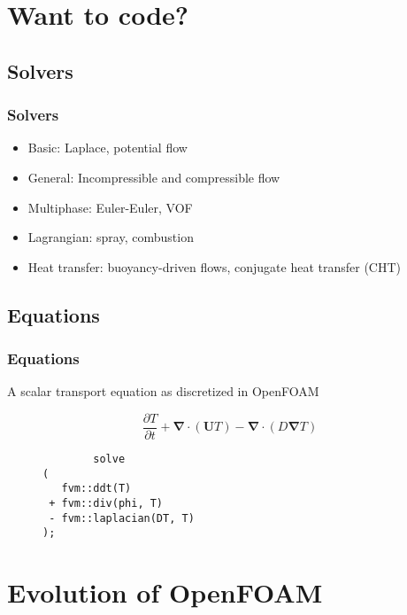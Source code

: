 \documentclass[notheorems, aspectratio=169]{beamer}
\begin{document}
\section{Want to code?}
\frame{\tableofcontents[currentsection]}
\subsection{Solvers}

\begin{frame}
  \frametitle{Solvers}
  \begin{itemize}
   \item Basic: Laplace, potential flow
   \item General: Incompressible and compressible flow
   \item Multiphase: Euler-Euler, VOF 
   \item Lagrangian: spray, combustion
   \item Heat transfer: buoyancy-driven flows, conjugate heat transfer (CHT)
  \end{itemize}
  \end{frame}



\subsection{Equations}
\begin{frame}[fragile]
\frametitle{Equations}
A scalar transport equation as discretized in OpenFOAM
\begin{figure}[!htb]
  \centering
  \begin{minipage}{.5\textwidth}
   $$ \frac{\partial T}{\partial t}  + \mathbf{\nabla} \cdot (\mathbf{U} T)  - \mathbf{\nabla} \cdot (D \mathbf{\nabla} T)  $$
  \end{minipage}%
  \begin{minipage}{0.5\textwidth}
      \centering
      \begin{lstlisting}
        solve
(
   fvm::ddt(T)             
 + fvm::div(phi, T)        
 - fvm::laplacian(DT, T)   
);
      \end{lstlisting}
  \end{minipage}
\end{figure}
\end{frame}
  
  



\section{Evolution of OpenFOAM}
\frame{\tableofcontents[currentsection]}
\end{document}
